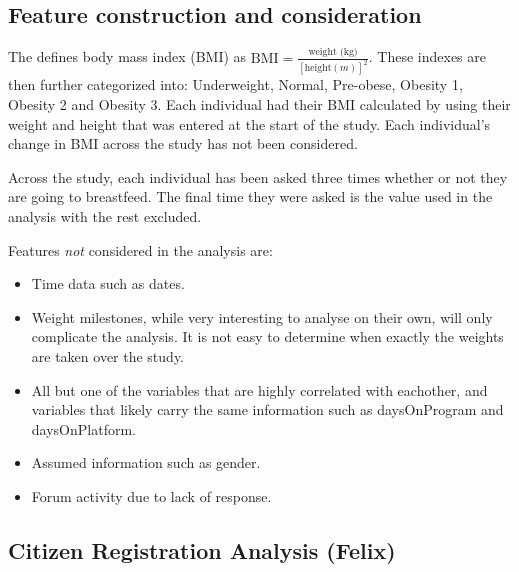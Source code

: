 \documentclass[12pt]{article}
\begin{document}

\subsection{Feature construction and consideration}
	
	The \cite{WHO_BMI} defines body mass index (BMI) as $\text{BMI} = \frac{\text{weight (kg)}}{\left[\text{height} (m)\right]^2}$. These indexes are then further categorized into: Underweight, Normal, Pre-obese, Obesity 1, Obesity 2 and Obesity 3. Each individual had their BMI calculated by using their weight and height that was entered at the start of the study. Each individual's change in BMI across the study has not been considered.

	Across the study, each individual has been asked three times whether or not they are going to breastfeed. The final time they were asked is the value used in the analysis with the rest excluded.
	
	Features \emph{not} considered in the analysis are:
	\begin{itemize}
		\item Time data such as dates.
		\item Weight milestones, while very interesting to analyse on their own, will only complicate the analysis. It is not easy to determine when exactly the weights are taken over the study.
		\item All but one of the variables that are highly correlated with eachother, and variables that likely carry the same information such as daysOnProgram and daysOnPlatform.
		\item Assumed information such as gender.
		\item Forum activity due to lack of response.
	\end{itemize} 


\subsection{Citizen Registration Analysis (Felix)}
\end{document}
